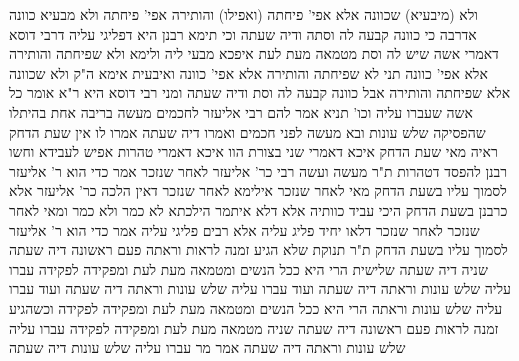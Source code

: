 \documentclass[12pt, openany]{book}
\begin{document}
{ולא (מיבעיא) שכוונה אלא אפי' פיחתה (ואפילו) והותירה 
אפי' פיחתה ולא מבעיא כוונה אדרבה כי כוונה קבעה לה וסתה ודיה שעתה 
וכי תימא רבנן היא דפליגי עליה דרבי דוסא דאמרי אשה שיש לה וסת מטמאה מעת לעת איפכא מבעי ליה ולימא ולא שפיחתה והותירה אלא אפי' כוונה 
תני לא שפיחתה והותירה אלא אפי' כוונה ואיבעית אימא ה"ק ולא שכוונה אלא שפיחתה והותירה אבל כוונה קבעה לה וסת ודיה שעתה ומני רבי דוסא היא
ר"א אומר כל אשה שעברו עליה וכו' תניא אמר להם רבי אליעזר לחכמים מעשה בריבה אחת בהיתלו שהפסיקה שלש עונות ובא מעשה לפני חכמים ואמרו דיה שעתה 
אמרו לו אין שעת הדחק ראיה מאי שעת הדחק איכא דאמרי שני בצורת הוו איכא דאמרי טהרות אפיש לעבידא וחשו רבנן להפסד דטהרות 
ת"ר מעשה ועשה רבי כר' אליעזר לאחר שנזכר אמר כדי הוא ר' אליעזר לסמוך עליו בשעת הדחק מאי לאחר שנזכר אילימא לאחר שנזכר דאין הלכה כר' אליעזר אלא כרבנן בשעת הדחק היכי עביד כוותיה 
אלא דלא איתמר הילכתא לא כמר ולא כמר ומאי לאחר שנזכר לאחר שנזכר דלאו יחיד פליג עליה אלא רבים פליגי עליה אמר כדי הוא ר' אליעזר לסמוך עליו בשעת הדחק 
ת"ר תנוקת שלא הגיע זמנה לראות וראתה פעם ראשונה דיה שעתה שניה דיה שעתה שלישית הרי היא ככל הנשים ומטמאה מעת לעת ומפקידה לפקידה 
עברו עליה שלש עונות וראתה דיה שעתה ועוד עברו עליה שלש עונות וראתה דיה שעתה ועוד עברו עליה שלש עונות וראתה הרי היא ככל הנשים ומטמאה מעת לעת ומפקידה לפקידה
וכשהגיע זמנה לראות פעם ראשונה דיה שעתה שניה מטמאה מעת לעת ומפקידה לפקידה עברו עליה שלש עונות וראתה דיה שעתה 
אמר מר עברו עליה שלש עונות דיה שעתה}
\end{document}

